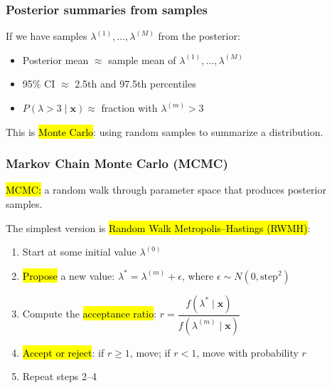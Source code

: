 \documentclass[slidestop,compress,mathserif]{beamer}
\begin{document}
\begin{frame}
\frametitle{Posterior summaries from samples}

If we have samples $\lambda^{(1)}, \ldots, \lambda^{(M)}$ from the posterior:

\pause
\medskip

\begin{itemize}
    \item Posterior mean $\approx$ sample mean of $\lambda^{(1)}, \ldots, \lambda^{(M)}$
    \item 95\% CI $\approx$ 2.5th and 97.5th percentiles
    \item $P(\lambda > 3 \mid \mathbf{x}) \approx$ fraction with $\lambda^{(m)} > 3$
\end{itemize}

\pause
\bigskip

This is \hl{Monte Carlo}: using random samples to summarize a distribution.

\pause
\bigskip

\end{frame}

\begin{frame}
\frametitle{Markov Chain Monte Carlo (MCMC)}

\hl{MCMC:} a random walk through parameter space that produces posterior samples.

\pause
\medskip

The simplest version is \hl{Random Walk Metropolis--Hastings (RWMH)}:
\begin{enumerate}
    \item Start at some initial value $\lambda^{(0)}$
    \pause
    \medskip
    \item \hl{Propose} a new value: $\lambda^* = \lambda^{(m)} + \epsilon$, where $\epsilon \sim N(0, \text{step}^2)$
    \pause
    \medskip
    \item Compute the \hl{acceptance ratio}: $r = \dfrac{f(\lambda^* \mid \mathbf{x})}{f(\lambda^{(m)} \mid \mathbf{x})}$
    \pause
    \medskip
    \item \hl{Accept or reject}: if $r \geq 1$, move; if $r < 1$, move with probability $r$
    \pause
    \medskip
    \item Repeat steps 2--4
\end{enumerate}
\end{frame}
\end{document}
